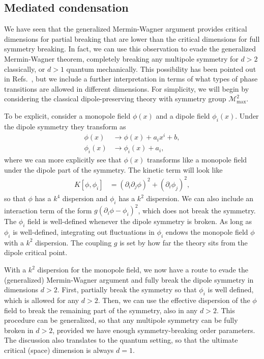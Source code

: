 \documentclass[twocolumn, longbibliography]{revtex4-2}
\newcommand{\nn}{\nonumber\\}
\newcommand{\goesto}{\rightarrow}
\renewcommand{\max}{\text{max}}
\begin{document}
\subsection{Mediated condensation} \label{sub:mediated}

We have seen that the generalized Mermin-Wagner argument provides critical dimensions for partial breaking that are lower than the critical dimensions for full symmetry breaking. In fact, we can use this observation to evade the generalized Mermin-Wagner theorem, completely breaking any multipole symmetry for $d>2$ classically, or $d>1$ quantum mechanically. This possibility has been pointed out in Refs.~\cite{Griffin2015Cascade, Griffin2015}, but we include a further interpretation in terms of what types of phase transitions are allowed in different dimensions. For simplicity, we will begin by considering the classical dipole-preserving theory with symmetry group $\mathcal{M}^2_\max$.

To be explicit, consider a monopole field $\phi(x)$ and a dipole field $\phi_i(x)$. Under the dipole symmetry they transform as 
\begin{align}
\phi(x) &\goesto \phi(x) + a_ix^i + b,\nn
\phi_i(x) &\goesto \phi_i(x) + a_i,
\end{align}
where we can more explicitly see that $\phi(x)$ transforms like a monopole field under the dipole part of the symmetry. The kinetic term will look like
\begin{align}
K[\phi,\phi_i] &= (\partial_i \partial_j \phi)^2 + (\partial_i \phi_j)^2,
\end{align}
so that $\phi$ has a $k^4$ dispersion and $\phi_i$ has a $k^2$ dispersion. We can also include an interaction term of the form $g(\partial_i \phi - \phi_i)^2$, which does not break the symmetry.  The $\phi_i$ field is well-defined whenever the dipole symmetry is broken. As long as $\phi_i$ is well-defined, integrating out fluctuations in $\phi_i$ endows the monopole field $\phi$ with a $k^2$ dispersion. The coupling $g$ is set by how far the theory sits from the dipole critical point.

With a $k^2$ dispersion for the monopole field, we now have a route to evade the (generalized) Mermin-Wagner argument and fully break the dipole symmetry in dimensions $d> 2$. First, partially break the symmetry so that $\phi_i$ is well defined, which is allowed for any $d>2$. Then, we can use the effective dispersion of the $\phi$ field to break the remaining part of the symmetry, also in any $d>2$. This procedure can be generalized, so that any multipole symmetry can be fully broken in $d>2$, provided we have enough symmetry-breaking order parameters. The discussion also translates to the quantum setting, so that the ultimate critical (space) dimension is always $d=1$. 
\end{document}
